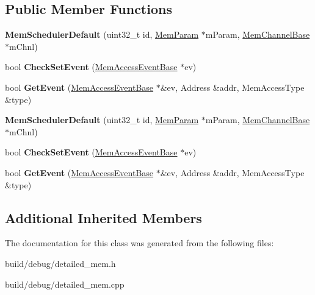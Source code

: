 \subsection*{Public Member Functions}
\begin{DoxyCompactItemize}
\item 
\hypertarget{classMemSchedulerDefault_ad41c1712277da576afd22a5054a21fbf}{{\bfseries Mem\-Scheduler\-Default} (uint32\-\_\-t id, \hyperlink{classMemParam}{Mem\-Param} $\ast$m\-Param, \hyperlink{classMemChannelBase}{Mem\-Channel\-Base} $\ast$m\-Chnl)}\label{classMemSchedulerDefault_ad41c1712277da576afd22a5054a21fbf}

\item 
\hypertarget{classMemSchedulerDefault_a0bdabadb1fead281bff9412233fa3697}{bool {\bfseries Check\-Set\-Event} (\hyperlink{classMemAccessEventBase}{Mem\-Access\-Event\-Base} $\ast$ev)}\label{classMemSchedulerDefault_a0bdabadb1fead281bff9412233fa3697}

\item 
\hypertarget{classMemSchedulerDefault_ab522d755027139848c8cdfc2270924f6}{bool {\bfseries Get\-Event} (\hyperlink{classMemAccessEventBase}{Mem\-Access\-Event\-Base} $\ast$\&ev, Address \&addr, Mem\-Access\-Type \&type)}\label{classMemSchedulerDefault_ab522d755027139848c8cdfc2270924f6}

\item 
\hypertarget{classMemSchedulerDefault_ad41c1712277da576afd22a5054a21fbf}{{\bfseries Mem\-Scheduler\-Default} (uint32\-\_\-t id, \hyperlink{classMemParam}{Mem\-Param} $\ast$m\-Param, \hyperlink{classMemChannelBase}{Mem\-Channel\-Base} $\ast$m\-Chnl)}\label{classMemSchedulerDefault_ad41c1712277da576afd22a5054a21fbf}

\item 
\hypertarget{classMemSchedulerDefault_a0bdabadb1fead281bff9412233fa3697}{bool {\bfseries Check\-Set\-Event} (\hyperlink{classMemAccessEventBase}{Mem\-Access\-Event\-Base} $\ast$ev)}\label{classMemSchedulerDefault_a0bdabadb1fead281bff9412233fa3697}

\item 
\hypertarget{classMemSchedulerDefault_ab522d755027139848c8cdfc2270924f6}{bool {\bfseries Get\-Event} (\hyperlink{classMemAccessEventBase}{Mem\-Access\-Event\-Base} $\ast$\&ev, Address \&addr, Mem\-Access\-Type \&type)}\label{classMemSchedulerDefault_ab522d755027139848c8cdfc2270924f6}

\end{DoxyCompactItemize}
\subsection*{Additional Inherited Members}


The documentation for this class was generated from the following files\-:\begin{DoxyCompactItemize}
\item 
build/debug/detailed\-\_\-mem.\-h\item 
build/debug/detailed\-\_\-mem.\-cpp\end{DoxyCompactItemize}
